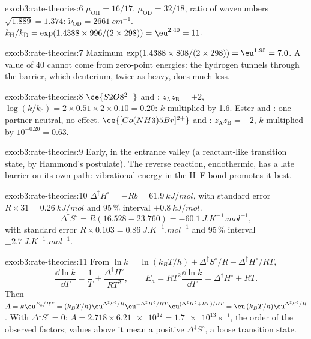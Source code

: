 \begin{solution}{exo:b3:rate-theories:6}
$\mu_{\mathrm{OH}} = 16/17$, $\mu_{\mathrm{OD}} = 32/18$, ratio of wavenumbers $\sqrt{1.889} = 1.374$:
$\tilde\nu_{\mathrm{OD}} = \qty{2661}{cm^{-1}}$. $k_{\mathrm H}/k_{\mathrm D} = \exp(1.4388 \times 996/(2 \times 298)) = \eu^{2.40} = 11$.
\end{solution}

\begin{solution}{exo:b3:rate-theories:7}
Maximum $\exp(1.4388 \times 808/(2 \times 298)) = \eu^{1.95} = 7.0$. A value of 40 cannot come from
zero-point energies: the hydrogen tunnels through the barrier, which deuterium,
twice as heavy, does much less.
\end{solution}

\begin{solution}{exo:b3:rate-theories:8}
$\ce{S2O8^{2-}}$ and : $z_{\mathrm A}z_{\mathrm B} = +2$, $\log(k/k_0) = 2 \times 0.51 \times 2 \times 0.10 = 0.20$: $k$
multiplied by 1.6. Ester and : one partner neutral, no effect.
$\ce{[Co(NH3)5Br]^{2+}}$ and : $z_{\mathrm A}z_{\mathrm B} = -2$, $k$ multiplied by $10^{-0.20} = 0.63$.
\end{solution}

\begin{solution}{exo:b3:rate-theories:9}
Early, in the entrance valley (a reactant-like transition state, by Hammond's
postulate). The reverse reaction, endothermic, has a late barrier on its own
path: vibrational energy in the H--F bond promotes it best.
\end{solution}

\begin{solution}{exo:b3:rate-theories:10}
$\Delta^{\ddagger}H^\circ = -Rb = \qty{61.9}{kJ/mol}$, with standard error $R \times 31 = \qty{0.26}{kJ/mol}$ and
95\,\% interval $\pm\qty{0.8}{kJ/mol}$.
\[
  \Delta^{\ddagger}S^\circ = R(16.528 - 23.760) = \qty{-60.1}{J.K^{-1}.mol^{-1}},
\]
with standard error $R \times 0.103 = \qty{0.86}{J.K^{-1}.mol^{-1}}$ and 95\,\% interval $\pm\qty{2.7}{J.K^{-1}.mol^{-1}}$.
\end{solution}

\begin{solution}{exo:b3:rate-theories:11}
From $\ln k = \ln(k_BT/h) + \Delta^{\ddagger}S^\circ/R - \Delta^{\ddagger}H^\circ/RT$,
\[
  \frac{\dd\ln k}{\dd T} = \frac1T + \frac{\Delta^{\ddagger}H^\circ}{RT^2}, \qquad
  E_a = RT^2\frac{\dd\ln k}{\dd T} = \Delta^{\ddagger}H^\circ + RT .
\] Then $A = k\eu^{E_a/RT} = (k_BT/h)\eu^{\Delta^{\ddagger}S^\circ/R}\eu^{-\Delta^{\ddagger}H^\circ/RT}\eu^{(\Delta^{\ddagger}H^\circ + RT)/RT} =
\eu\,(k_BT/h)\eu^{\Delta^{\ddagger}S^\circ/R}$. With $\Delta^{\ddagger}S^\circ = 0$: $A = 2.718 \times \num{6.21e12} = \qty{1.7e13}{s^{-1}}$, the
order of the observed factors; values above it mean a positive $\Delta^{\ddagger}S^\circ$, a loose
transition state.
\end{solution}

